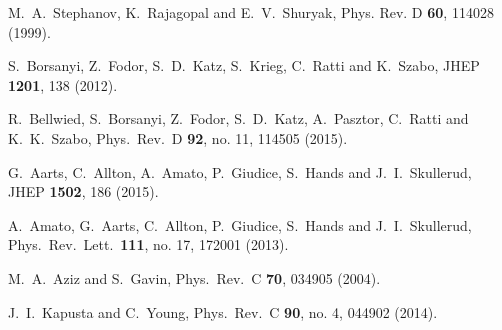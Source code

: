 \begin{thebibliography}{99}
M.~A.~Stephanov, K.~Rajagopal and E.~V.~Shuryak,
Phys. Rev. D \textbf{60}, 114028 (1999).

  S.~Borsanyi, Z.~Fodor, S.~D.~Katz, S.~Krieg, C.~Ratti and K.~Szabo,
  JHEP {\bf 1201}, 138 (2012).


  R.~Bellwied, S.~Borsanyi, Z.~Fodor, S.~D.~Katz, A.~Pasztor, C.~Ratti and K.~K.~Szabo,
  Phys.\ Rev.\ D {\bf 92}, no. 11, 114505 (2015).

  G.~Aarts, C.~Allton, A.~Amato, P.~Giudice, S.~Hands and J.~I.~Skullerud,
  JHEP {\bf 1502}, 186 (2015).

  A.~Amato, G.~Aarts, C.~Allton, P.~Giudice, S.~Hands and J.~I.~Skullerud,
  Phys.\ Rev.\ Lett.\  {\bf 111}, no. 17, 172001 (2013).

  M.~A.~Aziz and S.~Gavin,
  Phys.\ Rev.\ C {\bf 70}, 034905 (2004).

  J.~I.~Kapusta and C.~Young,
  Phys.\ Rev.\ C {\bf 90}, no. 4, 044902 (2014).


\end{thebibliography}
